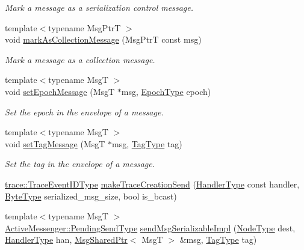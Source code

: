\begin{DoxyCompactItemize}
\begin{DoxyCompactList}\small\item\em Mark a message as a serialization control message. \end{DoxyCompactList}\item 
{\footnotesize template$<$typename Msg\+PtrT $>$ }\\void \hyperlink{structvt_1_1messaging_1_1_active_messenger_a0587ea992b0f1b06da38d52a3851aae5}{mark\+As\+Collection\+Message} (Msg\+PtrT const msg)
\begin{DoxyCompactList}\small\item\em Mark a message as a collection message. \end{DoxyCompactList}\item 
{\footnotesize template$<$typename MsgT $>$ }\\void \hyperlink{structvt_1_1messaging_1_1_active_messenger_a5fc9cb79e5cbef41007d847964c17113}{set\+Epoch\+Message} (MsgT $\ast$msg, \hyperlink{namespacevt_a81d11b28122d43bf9834577e4a06440f}{Epoch\+Type} epoch)
\begin{DoxyCompactList}\small\item\em Set the epoch in the envelope of a message. \end{DoxyCompactList}\item 
{\footnotesize template$<$typename MsgT $>$ }\\void \hyperlink{structvt_1_1messaging_1_1_active_messenger_ab6d3637cb3c416b3491b748aaf4bab48}{set\+Tag\+Message} (MsgT $\ast$msg, \hyperlink{namespacevt_a84ab281dae04a52a4b243d6bf62d0e52}{Tag\+Type} tag)
\begin{DoxyCompactList}\small\item\em Set the tag in the envelope of a message. \end{DoxyCompactList}\item 
\hyperlink{namespacevt_1_1trace_a64a7185f3e102df8d8258f263ccd1582}{trace\+::\+Trace\+Event\+I\+D\+Type} \hyperlink{structvt_1_1messaging_1_1_active_messenger_a73a4b3a082031fdd676ae7670f13de3d}{make\+Trace\+Creation\+Send} (\hyperlink{namespacevt_af64846b57dfcaf104da3ef6967917573}{Handler\+Type} const handler, \hyperlink{namespacevt_aab8d55968084610ce3b17057981e9300}{Byte\+Type} serialized\+\_\+msg\+\_\+size, bool is\+\_\+bcast)
\item 
{\footnotesize template$<$typename MsgT $>$ }\\\hyperlink{structvt_1_1messaging_1_1_active_messenger_a3626a6ca76d8ad4ec7c3b47a2c70d3a8}{Active\+Messenger\+::\+Pending\+Send\+Type} \hyperlink{structvt_1_1messaging_1_1_active_messenger_ae3c0b836a082ffb3f39d7610bdbe5b70}{send\+Msg\+Serializable\+Impl} (\hyperlink{namespacevt_a866da9d0efc19c0a1ce79e9e492f47e2}{Node\+Type} dest, \hyperlink{namespacevt_af64846b57dfcaf104da3ef6967917573}{Handler\+Type} han, \hyperlink{structvt_1_1messaging_1_1_msg_shared_ptr}{Msg\+Shared\+Ptr}$<$ MsgT $>$ \&msg, \hyperlink{namespacevt_a84ab281dae04a52a4b243d6bf62d0e52}{Tag\+Type} tag)

\end{DoxyCompactItemize}
